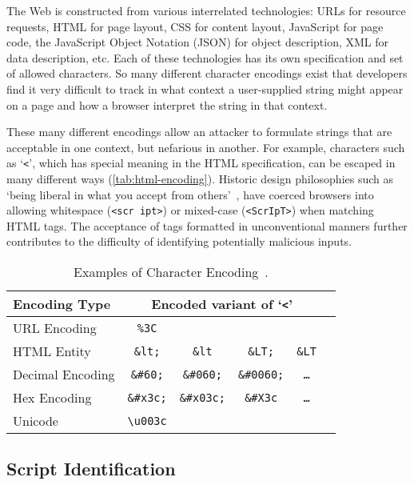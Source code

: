 The Web is constructed from various interrelated technologies: URLs for resource requests, HTML for page layout, CSS for content layout, JavaScript for page code, the JavaScript Object Notation (JSON) for object description, XML for data description, etc.
Each of these technologies has its own specification and set of allowed characters.
So many different character encodings exist that developers find it very difficult to track in what context a user-supplied string might appear on a page and how a browser interpret the string in that context.

These many different encodings allow an attacker to formulate strings that are acceptable in one context, but nefarious in another.
For example, characters such as `\texttt{<}', which has special meaning in the HTML specification, can be escaped in many different ways (\autoref{tab:html-encoding}).
Historic design philosophies such as `being liberal in what you accept from others'~\cite{rfc761}, have coerced browsers into allowing whitespace (\texttt{<scr ipt>}) or mixed-case (\texttt{<ScrIpT>}) when matching HTML tags.
The acceptance of tags formatted in unconventional manners further contributes to the difficulty of identifying potentially malicious inputs.

\begin{table}[ht]
\centering
\begin{tabular}{l|ccccc}
 \textbf{Encoding Type} & \multicolumn{4}{c}{\textbf{Encoded variant of `\texttt{<}'}} \\
 \hline
 URL Encoding           & \texttt{\%3C} &&&\\
 HTML Entity            & \texttt{\&lt;} & \texttt{\&lt} & \texttt{\&LT;} & \texttt{\&LT} \\
 Decimal Encoding       & \texttt{\&\#60;} & \texttt{\&\#060;} & \texttt{\&\#0060;} & \texttt{\ldots} \\
 Hex Encoding           & \texttt{\&\#x3c;} & \texttt{\&\#x03c;} & \texttt{\&\#X3c} & \texttt{\ldots} \\
 Unicode                & \texttt{\textbackslash u003c} &&&\\
\end{tabular}
\caption{Examples of Character Encoding~\cite{kals.etal+06}.}
\label{tab:html-encoding}
\end{table}

\subsection{Script Identification}

